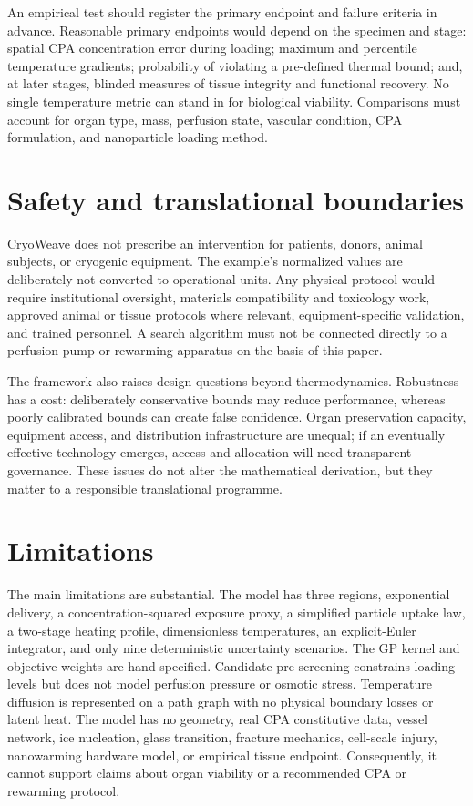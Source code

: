 \documentclass[11pt]{article}
\begin{document}
An empirical test should register the primary endpoint and failure criteria in advance. Reasonable primary endpoints would depend on the specimen and stage: spatial CPA concentration error during loading; maximum and percentile temperature gradients; probability of violating a pre-defined thermal bound; and, at later stages, blinded measures of tissue integrity and functional recovery. No single temperature metric can stand in for biological viability. Comparisons must account for organ type, mass, perfusion state, vascular condition, CPA formulation, and nanoparticle loading method.

\section{Safety and translational boundaries}

CryoWeave does not prescribe an intervention for patients, donors, animal subjects, or cryogenic equipment. The example's normalized values are deliberately not converted to operational units. Any physical protocol would require institutional oversight, materials compatibility and toxicology work, approved animal or tissue protocols where relevant, equipment-specific validation, and trained personnel. A search algorithm must not be connected directly to a perfusion pump or rewarming apparatus on the basis of this paper.

The framework also raises design questions beyond thermodynamics. Robustness has a cost: deliberately conservative bounds may reduce performance, whereas poorly calibrated bounds can create false confidence. Organ preservation capacity, equipment access, and distribution infrastructure are unequal; if an eventually effective technology emerges, access and allocation will need transparent governance. These issues do not alter the mathematical derivation, but they matter to a responsible translational programme.

\section{Limitations}

The main limitations are substantial. The model has three regions, exponential delivery, a concentration-squared exposure proxy, a simplified particle uptake law, a two-stage heating profile, dimensionless temperatures, an explicit-Euler integrator, and only nine deterministic uncertainty scenarios. The GP kernel and objective weights are hand-specified. Candidate pre-screening constrains loading levels but does not model perfusion pressure or osmotic stress. Temperature diffusion is represented on a path graph with no physical boundary losses or latent heat. The model has no geometry, real CPA constitutive data, vessel network, ice nucleation, glass transition, fracture mechanics, cell-scale injury, nanowarming hardware model, or empirical tissue endpoint. Consequently, it cannot support claims about organ viability or a recommended CPA or rewarming protocol.
\end{document}
